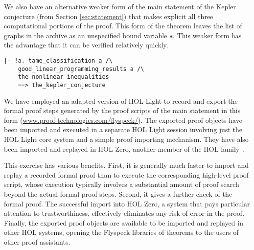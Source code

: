 We also have an alternative weaker form of the main statement of the
Kepler conjecture (from Section \ref{sec:statement}) that makes
explicit all three computational portions of the proof.  This form of
the theorem leaves the list of graphs in the archive as an unspecified
bound variable \verb!a!.  This weaker form has the advantage that it
can be verified relatively quickly.

\begin{obeylines}

\begin{verbatim}
|- !a. tame_classification a /\
    good_linear_programming_results a /\ 
    the_nonlinear_inequalities
    ==> the_kepler_conjecture
\end{verbatim}

\end{obeylines}

We have employed an adapted version of HOL Light to record and export
the formal proof steps generated by the proof scripts of the main
statement in this form (\url{www.proof-technologies.com/flyspeck/}).
The exported proof objects have been imported and executed in a
separate HOL Light session involving just the HOL Light core system
and a simple proof importing mechanism.  They have also been imported
and replayed in HOL Zero, another member of the HOL
family~\cite{adams2010introducing}.  


This exercise has various benefits.  First, it is generally much
faster to import and replay a recorded formal proof than to execute
the corresponding high-level proof script, whose execution typically
involves a substantial amount of proof search beyond the actual formal
proof steps. Second, it gives a further check of the formal proof.
The successful import into HOL
Zero, a system that pays particular attention to trustworthiness,
effectively eliminates any risk of error in the proof.
Finally, the exported proof objects are available to be imported and
replayed in other HOL systems, opening the Flyspeck libraries of
theorems to the users of other proof assistants.  







